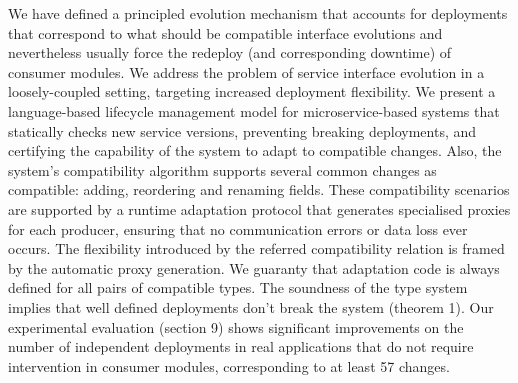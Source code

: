 We have defined a principled evolution mechanism that accounts for deployments
that correspond to what should be compatible interface evolutions and nevertheless
usually force the redeploy (and corresponding downtime) of consumer modules.
We address the problem of service interface evolution in a loosely-coupled setting,
targeting increased deployment flexibility. We present a language-based lifecycle
management model for microservice-based systems that statically checks new service
versions, preventing breaking deployments, and certifying the capability of the system
to adapt to compatible changes. Also, the system’s compatibility algorithm supports
several common changes as compatible: adding, reordering and renaming fields.
These compatibility scenarios are supported by a runtime adaptation protocol that
generates specialised proxies for each producer, ensuring that no communication
errors or data loss ever occurs. The flexibility introduced by the referred compatibility
relation is framed by the automatic proxy generation. We guaranty that adaptation
code is always defined for all pairs of compatible types. The soundness of the type
system implies that well defined deployments don’t break the system (theorem 1). Our
experimental evaluation (section 9) shows significant improvements on the number
of independent deployments in real applications that do not require intervention in
consumer modules, corresponding to at least 57 %
changes.